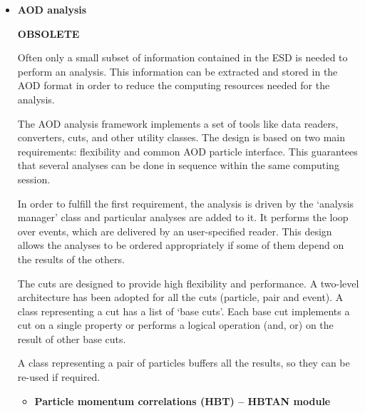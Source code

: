 \documentclass[12pt,a4paper,twoside]{article}
\newcommand{\pt}{\ensuremath{p_{\mathrm{t}}}}
\newcommand{\Jpsi} {\mbox{J\kern-0.05em /\kern-0.05em$\psi$}\xspace}
\newcommand{\Ups} {\mbox{$\Upsilon$}\xspace}
\begin{document}
{\begin{itemize}
\begin{itemize}
  \item[ ] \textbf{Quarkonia analysis}

    Muon tracks stored in the ESD can be analyzed for example by the macro
    \texttt{MUONmassPlot\_ESD.C}.
    This macro performs an invariant-mass analysis of muon unlike-sign pairs
    and calculates the combinatorial background.
    Quarkonia \pt and rapidity distribution are built for \Jpsi and \Ups.
    This macro also performs a fast single-muon analysis: \pt,
    rapidity, and 
    ${\rm \theta}$ vs ${\rm \varphi}$ acceptance distributions for positive
    and negative muon 
    tracks with a maximal-allowed ${\rm \chi^2}$.

  \end{itemize}

\item\textbf{AOD analysis}

{\bf OBSOLETE}

  Often only a small subset of information contained in the ESD
  is needed to perform an analysis. This information
  can be extracted and stored in the AOD format in order to reduce
  the computing resources needed for the analysis.

  The AOD analysis framework implements a set of tools like data readers,
  converters, cuts, and other utility classes.
  The design is based on two main requirements: flexibility and common
  AOD particle interface. This guarantees that several analyses can be
  done in sequence within the same computing session.

  In order to fulfill the first requirement, the analysis is driven by the
  `analysis manager' class and particular analyses are added to it.
  It performs the loop over events, which are delivered by an
  user-specified reader. This design allows the analyses to be ordered
  appropriately  if some  of them depend on the results of the others.

  The cuts are designed to provide high flexibility
  and performance. A two-level architecture has been adopted
  for all the cuts (particle, pair and event). A class representing a cut
  has a list of `base cuts'. Each base cut implements a cut on a
  single property or performs a logical operation (and, or) on the result of
  other base cuts.

  A class representing a pair of particles buffers all the results,
  so they can be re-used if required.

  \vspace{-0.2cm}
  \begin{itemize}
  \item[ ] \textbf{Particle momentum correlations (HBT) -- HBTAN module}


\end{itemize}
\end{itemize}}
\end{document}
